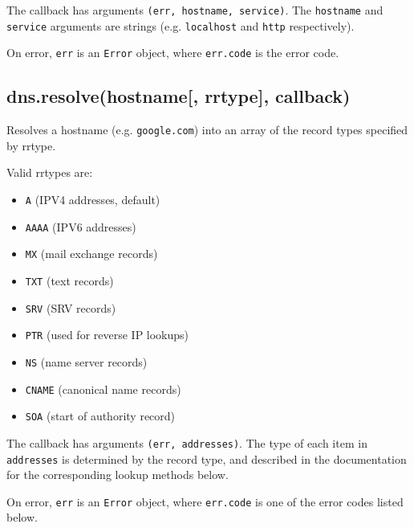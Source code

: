 The callback has arguments \texttt{(err,\ hostname,\ service)}. The
\texttt{hostname} and \texttt{service} arguments are strings (e.g.
\texttt{\textquotesingle{}localhost\textquotesingle{}} and
\texttt{\textquotesingle{}http\textquotesingle{}} respectively).

On error, \texttt{err} is an \texttt{Error} object, where
\texttt{err.code} is the error code.

\subsection{dns.resolve(hostname{[}, rrtype{]},
callback)}\label{dns.resolvehostname-rrtype-callback}

Resolves a hostname (e.g.
\texttt{\textquotesingle{}google.com\textquotesingle{}}) into an array
of the record types specified by rrtype.

Valid rrtypes are:

\begin{itemize}
\itemsep1pt\parskip0pt
\item
  \texttt{\textquotesingle{}A\textquotesingle{}} (IPV4 addresses,
  default)
\item
  \texttt{\textquotesingle{}AAAA\textquotesingle{}} (IPV6 addresses)
\item
  \texttt{\textquotesingle{}MX\textquotesingle{}} (mail exchange
  records)
\item
  \texttt{\textquotesingle{}TXT\textquotesingle{}} (text records)
\item
  \texttt{\textquotesingle{}SRV\textquotesingle{}} (SRV records)
\item
  \texttt{\textquotesingle{}PTR\textquotesingle{}} (used for reverse IP
  lookups)
\item
  \texttt{\textquotesingle{}NS\textquotesingle{}} (name server records)
\item
  \texttt{\textquotesingle{}CNAME\textquotesingle{}} (canonical name
  records)
\item
  \texttt{\textquotesingle{}SOA\textquotesingle{}} (start of authority
  record)
\end{itemize}

The callback has arguments \texttt{(err,\ addresses)}. The type of each
item in \texttt{addresses} is determined by the record type, and
described in the documentation for the corresponding lookup methods
below.

On error, \texttt{err} is an \texttt{Error} object, where
\texttt{err.code} is one of the error codes listed below.

